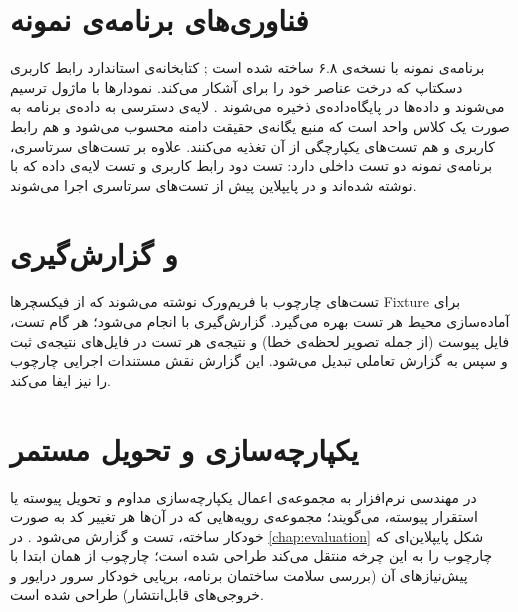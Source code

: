 \section{فناوری‌های برنامه‌ی نمونه}
برنامه‌ی نمونه با
نسخه‌ی ۶.۸ ساخته شده است
\cite{qtdocs};
کتابخانه‌ی استاندارد رابط کاربری دسکتاپ
که درخت عناصر خود را برای
آشکار می‌کند. نمودارها با ماژول
ترسیم می‌شوند و داده‌ها در پایگاه‌داده‌ی
ذخیره می‌شوند
\cite{sqlite}.
لایه‌ی دسترسی به داده‌ی برنامه به صورت یک کلاس واحد است که منبع یگانه‌ی حقیقت دامنه محسوب می‌شود و هم رابط کاربری و هم تست‌های یکپارچگی از آن تغذیه می‌کنند. علاوه بر تست‌های سرتاسری، برنامه‌ی نمونه دو تست داخلی دارد: تست دود رابط کاربری و تست لایه‌ی داده که با
\cite{qtcitest}
نوشته شده‌اند و در پایپلاین پیش از تست‌های سرتاسری اجرا می‌شوند.

\section{ و گزارش‌گیری }
تست‌های چارچوب با فریم‌ورک
\cite{pytest}
نوشته می‌شوند که از فیکسچرها
\gls{Fixture}
برای آماده‌سازی محیط هر تست بهره می‌گیرد. گزارش‌گیری با
\cite{allure}
انجام می‌شود؛ هر گام تست، فایل پیوست (از جمله تصویر لحظه‌ی خطا) و نتیجه‌ی هر تست در فایل‌های نتیجه‌ی
ثبت و سپس به گزارش تعاملی تبدیل می‌شود. این گزارش نقش مستندات اجرایی چارچوب را نیز ایفا می‌کند.

\section{یکپارچه‌سازی و تحویل مستمر}
در مهندسی نرم‌افزار به مجموعه‌ی اعمال یکپارچه‌سازی مداوم و تحویل پیوسته یا استقرار پیوسته،
می‌گویند؛ مجموعه‌ی رویه‌هایی که در آن‌ها هر تغییر کد به صورت خودکار ساخته، تست و گزارش می‌شود
\cite{crispin2009}. در \autoref{chap:evaluation}
شکل پایپلاین‌ای که چارچوب را به این چرخه منتقل می‌کند طراحی شده است؛ چارچوب از همان ابتدا با پیش‌نیازهای آن (بررسی سلامت ساختمان برنامه، برپایی خودکار سرور درایور و خروجی‌های قابل‌انتشار) طراحی شده است.